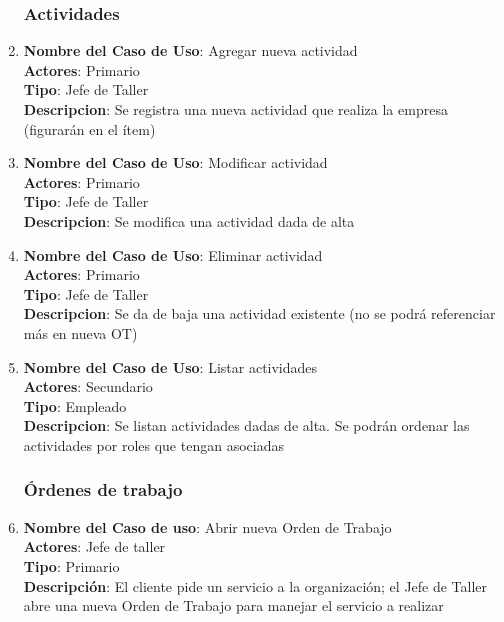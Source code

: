 \documentclass[12pt]{extarticle}
\begin{document}
\begin{spacing}{1.2}
\begin{enumerate}
            \subsubsection{Actividades}



            \item 	\textbf{Nombre del Caso de Uso}: Agregar nueva actividad\\
                    \textbf{Actores}: Primario\\
                    \textbf{Tipo}: Jefe de Taller\\
                    \textbf{Descripcion}: Se registra una nueva actividad que realiza la empresa (figurarán en el ítem)

            \item 	\textbf{Nombre del Caso de Uso}: Modificar actividad\\
                    \textbf{Actores}: Primario\\
                    \textbf{Tipo}: Jefe de Taller\\
                    \textbf{Descripcion}: Se modifica una actividad dada de alta

            \item 	\textbf{Nombre del Caso de Uso}: Eliminar actividad\\
                    \textbf{Actores}: Primario\\
                    \textbf{Tipo}: Jefe de Taller\\
                    \textbf{Descripcion}: Se da de baja una actividad existente (no se podrá referenciar más en nueva OT)

            \item 	\textbf{Nombre del Caso de Uso}: Listar actividades\\
                    \textbf{Actores}: Secundario\\
                    \textbf{Tipo}: Empleado\\
                    \textbf{Descripcion}: Se listan actividades dadas de alta. Se podrán ordenar las actividades por roles que tengan asociadas



            \subsubsection{Órdenes de trabajo}



            \item 	\textbf{Nombre del Caso de uso}: Abrir nueva Orden de Trabajo\\
                    \textbf{Actores}: Jefe de taller\\
                    \textbf{Tipo}: Primario\\
                    \textbf{Descripción}: El cliente pide un servicio a la organización; el Jefe de Taller abre una nueva Orden de Trabajo para manejar el servicio a realizar


\end{enumerate}
\end{spacing}
\end{document}
